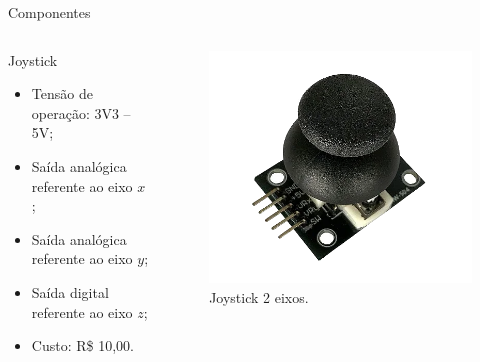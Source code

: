 \documentclass{if-beamer}
\begin{document}
\begin{frame}{Componentes}
	
	\begin{columns}
		
		\begin{column}{0.6\textwidth}
			
			\begin{block}{Joystick}
				
				\begin{itemize}
					\item Tensão de operação: 3V3 -- 5V;
					\item Saída analógica referente ao eixo $x$;
					\item Saída analógica referente ao eixo $y$;
					\item Saída digital referente ao eixo $z$;
					\item Custo: R\$ 10,00.
				\end{itemize}
				
			\end{block}
			
		\end{column}
		
		\begin{column}{0.4\textwidth}
			
			\begin{figure}[H]
				\centering
				\includegraphics[width=0.9\linewidth]{img/joystick}
				\caption{Joystick 2 eixos.}
				\label{fig:joystick}
			\end{figure}
			
		\end{column}
		
	\end{columns}
	
	
\end{frame}
\end{document}
